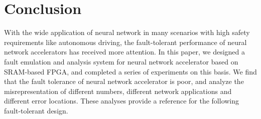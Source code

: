 \section{Conclusion} \label{sec:conclusion}

With the wide application of neural network in many 
scenarios with high safety requirements like autonomous 
driving, the fault-tolerant performance of neural network 
accelerators has received more attention. In this paper, we 
designed a fault emulation and analysis system for neural 
network accelerator based on SRAM-based FPGA, and completed 
a series of experiments on this basis. We find that the 
fault tolerance of neural network accelerator is poor, and 
analyze the misrepresentation of different numbers, 
different network applications and different error 
locations. These analyses provide a reference for the 
following fault-tolerant design.

